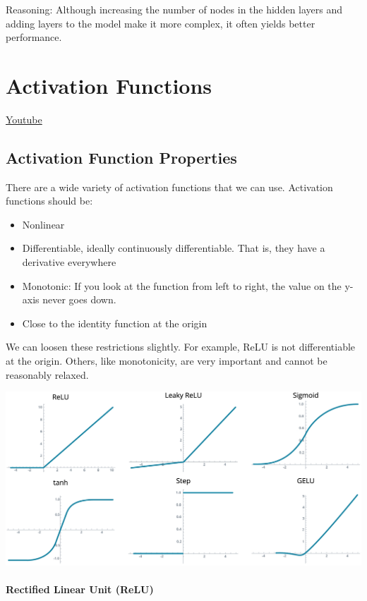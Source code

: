 Reasoning: Although increasing the number of nodes in the hidden layers and adding layers to the model make it more complex, it often yields better performance.

\section{Activation Functions}
\href{https://www.youtube.com/watch?v=DhGm2clOS-U&ab_channel=Udacity}{Youtube}

\subsection{Activation Function Properties}

There are a wide variety of activation functions that we can use. Activation functions should be:

\begin{itemize}
    \item Nonlinear
    \item Differentiable, ideally continuously differentiable. That is, they have a derivative everywhere
    \item Monotonic: If you look at the function from left to right, the value on the y-axis never goes down.
    \item Close to the identity function at the origin
\end{itemize}
We can loosen these restrictions slightly. For example, ReLU is not differentiable at the origin. Others, like monotonicity, are very important and cannot be reasonably relaxed.

\includegraphics[width=1\linewidth]{img//intro//introNN/activation-functions.jpeg}

\paragraph{Rectified Linear Unit (ReLU)}

